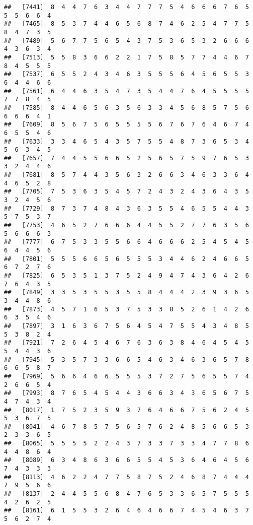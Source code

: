 \documentclass[
]{book}
\begin{document}
\begin{verbatim}
##   [7441]  8  4  4  7  6  3  4  4  7  7  7  5  4  6  6  6  7  6  5  5  5  6  6  4
##   [7465]  8  5  3  7  4  4  6  5  6  8  7  4  6  2  5  4  7  7  5  8  4  7  3  5
##   [7489]  5  6  7  7  5  6  5  4  3  7  5  3  6  5  3  2  6  6  6  4  3  6  3  4
##   [7513]  5  5  8  3  6  6  2  2  1  7  5  8  5  7  7  4  4  6  7  8  4  5  5  5
##   [7537]  6  5  5  2  4  3  4  6  3  5  5  5  6  4  5  6  5  5  3  6  4  4  6  6
##   [7561]  6  4  4  6  3  5  4  7  3  5  4  4  7  6  4  5  5  5  5  7  7  8  4  5
##   [7585]  8  4  4  6  5  6  3  5  6  3  3  4  5  6  8  5  7  5  6  6  6  6  4  1
##   [7609]  8  5  6  7  5  6  5  5  5  5  6  7  6  7  6  4  6  7  4  6  5  5  4  6
##   [7633]  3  3  4  6  5  4  3  5  7  5  5  4  8  7  3  6  5  3  4  5  6  3  4  5
##   [7657]  7  4  4  5  5  6  6  5  2  5  6  5  7  5  9  7  6  5  3  3  2  4  4  6
##   [7681]  8  5  7  4  4  3  5  6  3  2  6  6  3  4  6  3  3  6  4  4  6  5  2  8
##   [7705]  7  5  3  6  3  5  4  5  7  2  4  3  2  4  3  6  4  3  5  3  2  4  5  6
##   [7729]  8  7  3  7  4  8  4  3  6  3  5  5  4  6  5  5  4  4  3  5  7  5  3  7
##   [7753]  4  6  5  2  7  6  6  6  4  4  5  5  2  7  7  6  3  5  6  5  6  6  6  3
##   [7777]  6  7  5  3  3  5  5  6  6  4  6  6  6  2  5  4  5  4  5  6  4  4  5  6
##   [7801]  5  5  5  6  6  5  6  5  5  5  3  4  4  6  2  4  6  6  5  6  7  2  7  6
##   [7825]  6  5  3  5  1  3  7  5  2  4  9  4  7  4  3  6  4  2  6  7  6  4  3  5
##   [7849]  3  3  5  3  5  5  3  5  5  8  4  4  4  2  3  9  3  6  5  3  4  4  8  6
##   [7873]  4  5  7  1  6  5  3  7  5  3  3  8  5  2  6  1  4  2  6  6  3  5  4  6
##   [7897]  3  1  6  3  6  7  5  6  4  5  4  7  5  5  4  3  4  8  5  5  3  8  2  4
##   [7921]  7  2  6  4  5  4  6  7  6  3  6  3  8  4  6  4  5  4  5  5  4  4  3  6
##   [7945]  5  3  5  7  3  3  6  6  5  4  6  3  4  6  3  6  5  7  8  6  6  5  8  7
##   [7969]  5  6  6  4  6  6  5  5  5  3  7  2  7  5  6  5  5  7  4  2  6  6  5  4
##   [7993]  8  7  6  5  4  5  4  4  3  6  6  3  4  3  6  5  6  7  5  4  7  4  3  4
##   [8017]  1  7  5  2  3  5  9  3  7  6  4  6  6  7  5  6  2  4  5  5  3  6  7  5
##   [8041]  4  6  7  8  5  7  5  6  5  7  6  2  4  8  5  6  6  5  3  2  3  3  6  5
##   [8065]  5  5  5  5  2  2  4  3  7  3  3  7  3  3  4  7  7  8  6  4  4  8  6  4
##   [8089]  6  3  4  8  6  3  6  6  5  5  4  5  3  6  4  6  4  5  6  7  4  3  3  3
##   [8113]  4  6  2  2  4  7  7  5  8  7  5  2  4  6  8  7  4  4  4  7  9  5  6  6
##   [8137]  2  4  4  5  5  6  8  4  7  6  5  3  3  6  5  7  5  5  5  4  2  6  2  5
##   [8161]  6  1  5  5  3  2  6  4  6  4  6  6  7  4  5  4  6  3  7  5  6  2  7  4

\end{verbatim}
\end{document}
